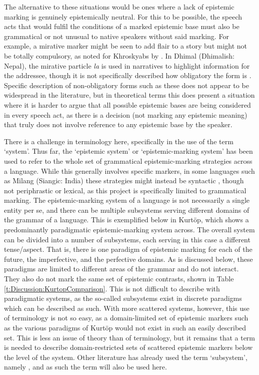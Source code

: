 The alternative to these situations would be ones where a lack of epistemic marking is genuinely epistemically neutral. For this to be possible, the speech acts that would fulfil the conditions of a marked epistemic base must also be grammatical or not unusual to native speakers without said marking. For example, a mirative marker might be seen to add flair to a story but might not be totally compulsory, as noted for Khroskyabs by . In Dhimal (Dhimalish: Nepal), the mirative particle \textit{la} is used in narratives to highlight information for the addressee, though it is not specifically described how obligatory the form is \cite[254]{King2009}. Specific description of non-obligatory forms such as these does not appear to be widespread in the literature, but in theoretical terms this does present a situation where it is harder to argue that all possible epistemic bases are being considered in every speech act, as there is a decision (not marking any epistemic meaning) that truly does not involve reference to any epistemic base by the speaker. 

There is a challenge in terminology here, specifically in the use of the term `system'. Thus far, the `epistemic system' or `epistemic-marking system' has been used to refer to the whole set of grammatical epistemic-marking strategies across a language. While this generally involves specific markers, in some languages such as Milang (Siangic: India) these strategies might instead be syntactic \cite{Modi2017}, though not periphrastic or lexical, as this project is specifically limited to grammatical marking. The epistemic-marking system of a language is not necessarily a single entity per se, and there can be multiple subsystems serving different domains of the grammar of a language. This is exemplified below in Kurtöp, which shows a predominantly paradigmatic epistemic-marking system across. The overall system can be divided into a number of subsystems, each serving in this case a different tense/aspect. That is, there is one paradigm of epistemic marking for each of the future, the imperfective, and the perfective domains. As is discussed below, these paradigms are limited to different areas of the grammar and do not interact. They also do not mark the same set of epistemic contrasts, shown in Table \ref{t:Discussion:KurtopComparison}. This is not difficult to describe with paradigmatic systems, as the so-called subsystems exist in discrete paradigms which can be described as such. With more scattered systems, however, this use of terminology is not so easy, as a domain-limited set of epistemic markers such as the various paradigms of Kurtöp would not exist in such an easily described set. This is less an issue of theory than of terminology, but it remains that a term is needed to describe domain-restricted sets of scattered epistemic markers below the level of the system. Other literature has already used the term `subsystem', namely , and as such the term will also be used here.

